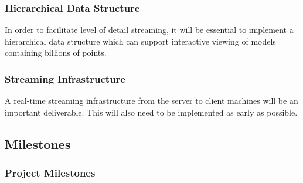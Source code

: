 \documentclass[12pt,a4paper]{article}
\begin{document}
\subsubsection*{Hierarchical Data Structure}
In order to facilitate level of detail streaming, it will be essential to
implement a hierarchical data structure which can support interactive
viewing of models containing billions of points.
\subsubsection*{Streaming Infrastructure}
A real-time streaming infrastructure from the server to client machines will be
an important deliverable. This will also need to be implemented as early as
possible.

\subsection{Milestones}
\subsubsection{Project Milestones}
\end{document}
